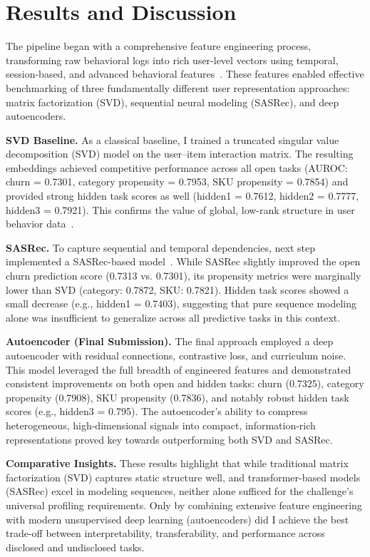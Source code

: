 \documentclass[sigconf]{acmart}
\begin{document}
\section{Results and Discussion}
The pipeline began with a comprehensive feature engineering process, transforming raw behavioral logs into rich user-level vectors using temporal, session-based, and advanced behavioral features~\cite{Quadrana2018, Christoffel2022}. These features enabled effective benchmarking of three fundamentally different user representation approaches: matrix factorization (SVD), sequential neural modeling (SASRec), and deep autoencoders.

\textbf{SVD Baseline.}
As a classical baseline, I trained a truncated singular value decomposition (SVD) model on the user–item interaction matrix. The resulting embeddings achieved competitive performance across all open tasks (AUROC: churn = 0.7301, category propensity = 0.7953, SKU propensity = 0.7854) and provided strong hidden task scores as well (hidden1 = 0.7612, hidden2 = 0.7777, hidden3 = 0.7921). This confirms the value of global, low-rank structure in user behavior data~\cite{Koren2009}.

\textbf{SASRec.}
To capture sequential and temporal dependencies,  next step implemented a SASRec-based model~\cite{Kang2018}. While SASRec slightly improved the open churn prediction score (0.7313 vs. 0.7301), its propensity metrics were marginally lower than SVD (category: 0.7872, SKU: 0.7821). Hidden task scores showed a small decrease (e.g., hidden1 = 0.7403), suggesting that pure sequence modeling alone was insufficient to generalize across all predictive tasks in this context.

\textbf{Autoencoder (Final Submission).}
The final approach employed a deep autoencoder with residual connections, contrastive loss, and curriculum noise. This model leveraged the full breadth of engineered features and demonstrated consistent improvements on both open and hidden tasks: churn (0.7325), category propensity (0.7908), SKU propensity (0.7836), and notably robust hidden task scores (e.g., hidden3 = 0.795). The autoencoder’s ability to compress heterogeneous, high-dimensional signals into compact, information-rich representations proved key towards outperforming both SVD and SASRec.

\textbf{Comparative Insights.}
These results highlight that while traditional matrix factorization (SVD) captures static structure well, and transformer-based models (SASRec) excel in modeling sequences, neither alone sufficed for the challenge’s universal profiling requirements. Only by combining extensive feature engineering with modern unsupervised deep learning (autoencoders) did I achieve the best trade-off between interpretability, transferability, and performance across disclosed and undisclosed tasks.
\end{document}
